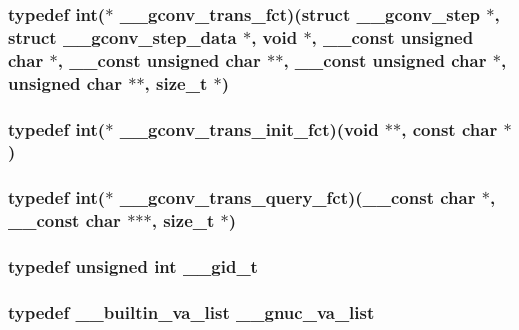 \subsubsection[{\_\-\_\-gconv\_\-trans\_\-fct}]{\setlength{\rightskip}{0pt plus 5cm}typedef int($\ast$ {\bf \_\-\_\-gconv\_\-trans\_\-fct})(struct {\bf \_\-\_\-gconv\_\-step} $\ast$, struct {\bf \_\-\_\-gconv\_\-step\_\-data} $\ast$, void $\ast$, \_\-\_\-const unsigned char $\ast$, \_\-\_\-const unsigned char $\ast$$\ast$, \_\-\_\-const unsigned char $\ast$, unsigned char $\ast$$\ast$, {\bf size\_\-t} $\ast$)}\label{tp_8c_a455325f25cdf8cd45d409820be61c180}
\subsubsection[{\_\-\_\-gconv\_\-trans\_\-init\_\-fct}]{\setlength{\rightskip}{0pt plus 5cm}typedef int($\ast$ {\bf \_\-\_\-gconv\_\-trans\_\-init\_\-fct})(void $\ast$$\ast$, const char $\ast$)}\label{tp_8c_ab388ed225a1ae888a53b5a8bf7e74e44}
\subsubsection[{\_\-\_\-gconv\_\-trans\_\-query\_\-fct}]{\setlength{\rightskip}{0pt plus 5cm}typedef int($\ast$ {\bf \_\-\_\-gconv\_\-trans\_\-query\_\-fct})(\_\-\_\-const char $\ast$, \_\-\_\-const char $\ast$$\ast$$\ast$, {\bf size\_\-t} $\ast$)}\label{tp_8c_a0bdc6040703958e94e967fc2967e48be}
\subsubsection[{\_\-\_\-gid\_\-t}]{\setlength{\rightskip}{0pt plus 5cm}typedef unsigned int {\bf \_\-\_\-gid\_\-t}}\label{tp_8c_adca764e7d69ca6b658b00179c1e3c01e}
\subsubsection[{\_\-\_\-gnuc\_\-va\_\-list}]{\setlength{\rightskip}{0pt plus 5cm}typedef \_\-\_\-builtin\_\-va\_\-list {\bf \_\-\_\-gnuc\_\-va\_\-list}}\label{tp_8c_ab2a2078340888ab219073daba0853b5a}
